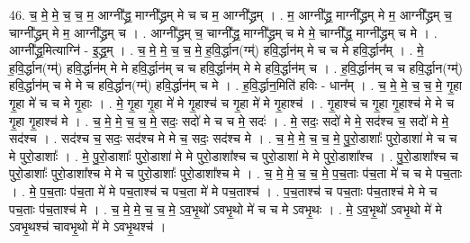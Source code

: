 \documentclass[17pt]{extarticle}
\begin{document}
46. च॒ मे॒ मे॒ च॒ च॒ म॒ आग्नी᳚द्ध्र॒ माग्नी᳚द्ध्रम् मे च च म॒ आग्नी᳚द्ध्रम् । . म॒ आग्नी᳚द्ध्र॒ माग्नी᳚द्ध्रम् मे म॒ आग्नी᳚द्ध्रम् च॒ चाग्नी᳚द्ध्रम् मे म॒ आग्नी᳚द्ध्रम् च । . आग्नी᳚द्ध्रम् च॒ चाग्नी᳚द्ध्र॒ माग्नी᳚द्ध्रम् च मे मे॒ चाग्नी᳚द्ध्र॒ माग्नी᳚द्ध्रम् च मे । . आग्नी᳚द्ध्र॒मित्याग्नि॑ - इ॒द्ध्र॒म् । . च॒ मे॒ मे॒ च॒ च॒ मे॒ ह॒वि॒र्द्धान(ग्म्॑) हवि॒र्द्धान॑म् मे च च मे हवि॒र्द्धान᳚म् । . मे॒ ह॒वि॒र्द्धान(ग्म्॑) हवि॒र्द्धान॑म् मे मे हवि॒र्द्धान॑म् च च हवि॒र्द्धान॑म् मे मे हवि॒र्द्धान॑म् च । . ह॒वि॒र्द्धान॑म् च च हवि॒र्द्धान(ग्म्॑) हवि॒र्द्धान॑म् च मे मे च हवि॒र्द्धान(ग्म्॑) हवि॒र्द्धान॑म् च मे । . ह॒वि॒र्द्धान॒मिति॑ हविः - धान᳚म् । . च॒ मे॒ मे॒ च॒ च॒ मे॒ गृ॒हा गृ॒हा मे॑ च च मे गृ॒हाः । . मे॒ गृ॒हा गृ॒हा मे॑ मे गृ॒हाश्च॑ च गृ॒हा मे॑ मे गृ॒हाश्च॑ । . गृ॒हाश्च॑ च गृ॒हा गृ॒हाश्च॑ मे मे च गृ॒हा गृ॒हाश्च॑ मे । . च॒ मे॒ मे॒ च॒ च॒ मे॒ सदः॒ सदो॑ मे च च मे॒ सदः॑ । . मे॒ सदः॒ सदो॑ मे मे॒ सद॑श्च च॒ सदो॑ मे मे॒ सद॑श्च । . सद॑श्च च॒ सदः॒ सद॑श्च मे मे च॒ सदः॒ सद॑श्च मे । . च॒ मे॒ मे॒ च॒ च॒ मे॒ पु॒रो॒डाशाः᳚ पुरो॒डाशा॑ मे च च मे पुरो॒डाशाः᳚ । . मे॒ पु॒रो॒डाशाः᳚ पुरो॒डाशा॑ मे मे पुरो॒डाशा᳚श्च च पुरो॒डाशा॑ मे मे पुरो॒डाशा᳚श्च । . पु॒रो॒डाशा᳚श्च च पुरो॒डाशाः᳚ पुरो॒डाशा᳚श्च मे मे च पुरो॒डाशाः᳚ पुरो॒डाशा᳚श्च मे । . च॒ मे॒ मे॒ च॒ च॒ मे॒ प॒च॒ताः प॑च॒ता मे॑ च च मे पच॒ताः । . मे॒ प॒च॒ताः प॑च॒ता मे॑ मे पच॒ताश्च॑ च पच॒ता मे॑ मे पच॒ताश्च॑ । . प॒च॒ताश्च॑ च पच॒ताः प॑च॒ताश्च॑ मे मे च पच॒ताः प॑च॒ताश्च॑ मे । . च॒ मे॒ मे॒ च॒ च॒ मे॒ ऽव॒भृ॒थो॑ ऽवभृ॒थो मे॑ च च मे ऽवभृ॒थः । . मे॒ ऽव॒भृ॒थो॑ ऽवभृ॒थो मे॑ मे ऽवभृ॒थश्च॑ चावभृ॒थो मे॑ मे ऽवभृ॒थश्च॑ । \newline
\end{document}
